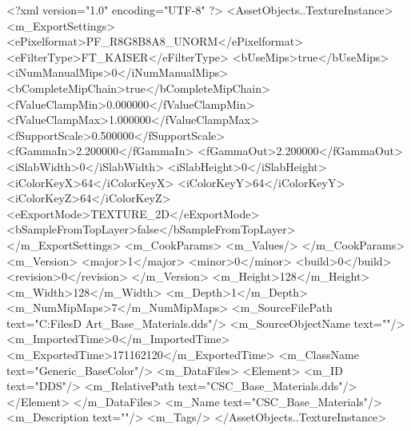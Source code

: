 <?xml version="1.0" encoding="UTF-8" ?>
<AssetObjects..TextureInstance>
	<m_ExportSettings>
		<ePixelformat>PF_R8G8B8A8_UNORM</ePixelformat>
		<eFilterType>FT_KAISER</eFilterType>
		<bUseMips>true</bUseMips>
		<iNumManualMips>0</iNumManualMips>
		<bCompleteMipChain>true</bCompleteMipChain>
		<fValueClampMin>0.000000</fValueClampMin>
		<fValueClampMax>1.000000</fValueClampMax>
		<fSupportScale>0.500000</fSupportScale>
		<fGammaIn>2.200000</fGammaIn>
		<fGammaOut>2.200000</fGammaOut>
		<iSlabWidth>0</iSlabWidth>
		<iSlabHeight>0</iSlabHeight>
		<iColorKeyX>64</iColorKeyX>
		<iColorKeyY>64</iColorKeyY>
		<iColorKeyZ>64</iColorKeyZ>
		<eExportMode>TEXTURE_2D</eExportMode>
		<bSampleFromTopLayer>false</bSampleFromTopLayer>
	</m_ExportSettings>
	<m_CookParams>
		<m_Values/>
	</m_CookParams>
	<m_Version>
		<major>1</major>
		<minor>0</minor>
		<build>0</build>
		<revision>0</revision>
	</m_Version>
	<m_Height>128</m_Height>
	<m_Width>128</m_Width>
	<m_Depth>1</m_Depth>
	<m_NumMipMaps>7</m_NumMipMaps>
	<m_SourceFilePath text="C:\Users\Shadow\Desktop\Working Files\2D Art\Adjacencies\CSC_Base_Materials.dds"/>
	<m_SourceObjectName text=""/>
	<m_ImportedTime>0</m_ImportedTime>
	<m_ExportedTime>171162120</m_ExportedTime>
	<m_ClassName text="Generic_BaseColor"/>
	<m_DataFiles>
		<Element>
			<m_ID text="DDS"/>
			<m_RelativePath text="CSC_Base_Materials.dds"/>
		</Element>
	</m_DataFiles>
	<m_Name text="CSC_Base_Materials"/>
	<m_Description text=""/>
	<m_Tags/>
</AssetObjects..TextureInstance>

